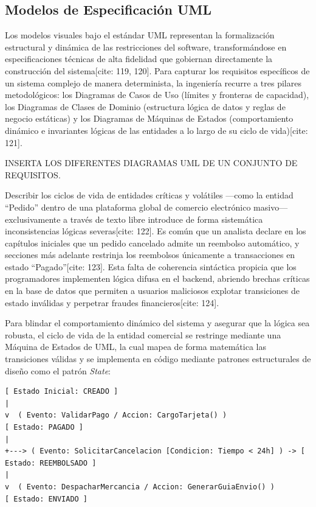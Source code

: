 \documentclass[11pt,a4paper]{article}
\begin{document}
	\subsection{Modelos de Especificación UML}
	Los modelos visuales bajo el estándar UML representan la formalización estructural y dinámica de las restricciones del software, transformándose en especificaciones técnicas de alta fidelidad que gobiernan directamente la construcción del sistema[cite: 119, 120]. Para capturar los requisitos específicos de un sistema complejo de manera determinista, la ingeniería recurre a tres pilares metodológicos: los Diagramas de Casos de Uso (límites y fronteras de capacidad), los Diagramas de Clases de Dominio (estructura lógica de datos y reglas de negocio estáticas) y los Diagramas de Máquinas de Estados (comportamiento dinámico e invariantes lógicas de las entidades a lo largo de su ciclo de vida)[cite: 121].
	
	INSERTA LOS DIFERENTES DIAGRAMAS UML DE UN CONJUNTO DE REQUISITOS.
	
	Describir los ciclos de vida de entidades críticas y volátiles —como la entidad ``Pedido'' dentro de una plataforma global de comercio electrónico masivo— exclusivamente a través de texto libre introduce de forma sistemática inconsistencias lógicas severas[cite: 122]. Es común que un analista declare en los capítulos iniciales que un pedido cancelado admite un reembolso automático, y secciones más adelante restrinja los reembolsos únicamente a transacciones en estado ``Pagado''[cite: 123]. Esta falta de coherencia sintáctica propicia que los programadores implementen lógica difusa en el backend, abriendo brechas críticas en la base de datos que permiten a usuarios maliciosos explotar transiciones de estado inválidas y perpetrar fraudes financieros[cite: 124].
	
	Para blindar el comportamiento dinámico del sistema y asegurar que la lógica sea robusta, el ciclo de vida de la entidad comercial se restringe mediante una Máquina de Estados de UML, la cual mapea de forma matemática las transiciones válidas y se implementa en código mediante patrones estructurales de diseño como el patrón \textit{State}:
	
	\begin{lstlisting}[caption={Flujo de Transición de Estados de la Entidad Pedido (UML Dinámico)}]
[ Estado Inicial: CREADO ] 
|
v  ( Evento: ValidarPago / Accion: CargoTarjeta() )
[ Estado: PAGADO ] 
|
+---> ( Evento: SolicitarCancelacion [Condicion: Tiempo < 24h] ) -> [ Estado: REEMBOLSADO ]
|
v  ( Evento: DespacharMercancia / Accion: GenerarGuiaEnvio() )
[ Estado: ENVIADO ]
	\end{lstlisting}
	
\end{document}

